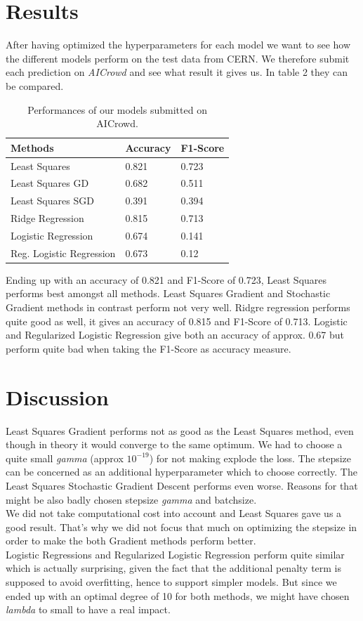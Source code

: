 \documentclass[10pt,conference,compsocconf]{IEEEtran}
\begin{document}
\section{Results}


After having optimized the hyperparameters for each model we want to see how the different models perform on the test data from CERN. We therefore submit each prediction on \textit{AICrowd} and see what result it gives us. In table 2 they can be compared.


\begin{table}[htbp]
	\centering
	\begin{tabular}[c]{|l||l|l|}
		\hline
		Methods&Accuracy&F1-Score\\
		\hline
		Least Squares&0.821&0.723\\
		Least Squares GD&0.682&0.511\\
		Least Squares SGD&0.391&0.394\\		
		Ridge Regression&0.815&0.713\\
		Logistic Regression&0.674&0.141\\
		Reg. Logistic Regression&0.673&0.12\\
		\hline
	\end{tabular}
	\caption{Performances of our models submitted on AICrowd.}
	\label{tab:perform}
\end{table}

Ending up with an accuracy of 0.821 and F1-Score of 0.723, Least Squares performs best amongst all methods. Least Squares Gradient and Stochastic Gradient methods in contrast perform not very well. 
Ridgre regression performs quite good as well, it gives an accuracy of 0.815 and F1-Score of 0.713.
Logistic and Regularized Logistic Regression give both an accuracy of approx. 0.67 but perform quite bad when taking the F1-Score as accuracy measure. 


\section{Discussion}

 
Least Squares Gradient performs not as good as the Least Squares method, even though in theory it would converge to the same optimum. We had to choose a quite small \textit{gamma} (approx $10^{-19}$) for not making explode the loss. The stepsize can be concerned as an additional hyperparameter which to choose correctly. The Least Squares Stochastic Gradient Descent performs even worse. Reasons for that might be also badly chosen stepsize \textit{gamma} and batchsize.\\
We did not take computational cost into account and Least Squares gave us a good result. That's why we did not focus that much on optimizing the stepsize in order to make the both Gradient methods perform better. \\
Logistic Regressions and Regularized Logistic Regression perform quite similar which is actually surprising, given the fact that the additional penalty term is supposed to avoid overfitting, hence to support simpler models. But since we ended up with an optimal degree of 10 for both methods, we might have chosen \textit{lambda} to small to have a real impact.
\end{document}
